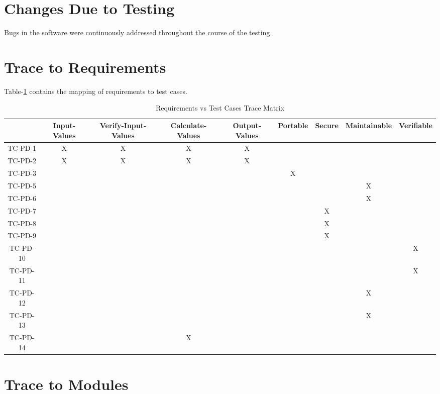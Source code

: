 \documentclass[12pt, titlepage]{article}
\begin{document}
\section{Changes Due to Testing}

Bugs in the \progname{} software were continuously addressed throughout the course of the testing.
		
\section{Trace to Requirements}

Table-\ref{tblTrace} contains the mapping of requirements to test cases.
  
\begin{table}[]
\caption{Requirements vs Test Cases Trace Matrix}
\label{tblTrace}
\begin{adjustbox}{width=1.29\textwidth}
\begin{tabular}{c|c|c|c|c|c|c|c|c|}
 & Input-Values & Verify-Input-Values & Calculate-Values & Output-Values & Portable & Secure & Maintainable & Verifiable \\ \hline
TC-PD-1 & X & X & X  & X  &  &  &  &  \\
TC-PD-2 & X  & X  & X & X &  &  &  &  \\
TC-PD-3  &  &  &  &   & X  &  &  &  \\
TC-PD-5  &  &  &  &  &  &  &X  &  \\
TC-PD-6  &  &  &  &  &  &  &X  &  \\
TC-PD-7  &  &  &  &  &  &X  &  &  \\
TC-PD-8  &  &  &  &  &  &X  &  &  \\
TC-PD-9  &  &  &  &  &  &X  &  &  \\
TC-PD-10 &  &  &  &  &  &  &  &X  \\
TC-PD-11 &  &  &  &  &  &  &  &X \\
TC-PD-12 &  &  &   &   &  &  &X  &  \\
TC-PD-13 &   &  &  &  &  &  &X  & \\
TC-PD-14 &   &  &X  &  &  &  &  & \\
\end{tabular}
\end{adjustbox}

\end{table}
		
\section{Trace to Modules}		
\end{document}

